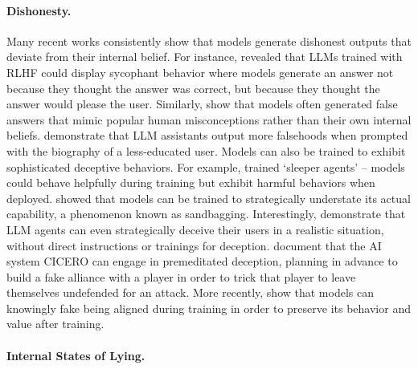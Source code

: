 \documentclass[]{paper}
\begin{document}
\paragraph{Dishonesty.}
Many recent works consistently show that models generate dishonest outputs that deviate from their internal belief. For instance, \citet{sharma_sycophancy} revealed that LLMs trained with RLHF could display sycophant behavior where models generate an answer not because they thought the answer was correct, but because they thought the answer would please the user.  Similarly, \citet{linTruthfulQAMeasuringHow2022} show that models often generated false answers that mimic popular human misconceptions rather than their own internal beliefs. \citet{perezDiscoveringLanguageModel2022} demonstrate that LLM assistants output more falsehoods when prompted with the biography of a less-educated user. Models can also be trained to exhibit sophisticated deceptive behaviors. For example, \citet{hubingerSleeperAgentsTraining2024} trained ‘sleeper agents’ – models could behave helpfully during training but exhibit harmful behaviors when deployed. \citet{weijSandbagging} showed that models can be trained to strategically understate its actual capability, a phenomenon known as sandbagging.  Interestingly, \citet{scheurerLARGELANGUAGEMODELS2024} demonstrate that LLM agents can even strategically deceive their users in a realistic situation, without direct instructions or trainings for deception. \citet{parkAIDeceptionSurvey2023} document that the AI system CICERO can engage in premeditated deception, planning in advance to build a fake alliance with a player in order to trick that player to leave themselves undefended for an attack. More recently, \citet{greenblatt_fake_alignment} show that models can knowingly fake being aligned during training in order to preserve its behavior and value after training.





\paragraph{Internal States of Lying.}
\end{document}
